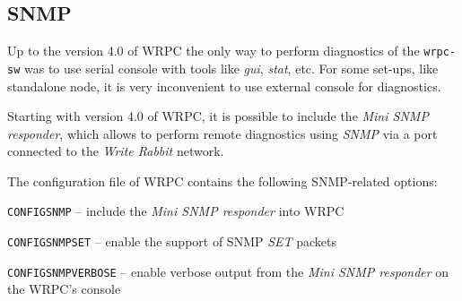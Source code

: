 \documentclass[a4paper, 12pt]{article}
\renewcommand{\_}{\underscore\allowbreak}
\begin{document}
\subsection{SNMP}
\label{Diagnostics via SNMP}

Up to the version 4.0 of WRPC the only way to perform diagnostics
of the \texttt{wrpc-sw} was to use serial console with tools like \textit{gui}, \textit{stat},
etc. For some set-ups, like standalone node, it is very inconvenient to use
external console for diagnostics.

Starting with version 4.0 of WRPC, it is possible to include the \textit{Mini
SNMP responder}, which allows to perform remote diagnostics using \textit{SNMP} via
a port connected to the \textit{Write Rabbit} network.

The configuration file of WRPC contains the following
SNMP-related options:
\begin{itemize*}
\item \texttt{CONFIG\_SNMP} -- include the \textit{Mini SNMP responder} into WRPC
\item \texttt{CONFIG\_SNMP\_SET} -- enable the support of SNMP \textit{SET} packets
\item \texttt{CONFIG\_SNMP\_VERBOSE} -- enable verbose output from the \textit{Mini SNMP
      responder} on the WRPC's console
\end{itemize*}
\end{document}
